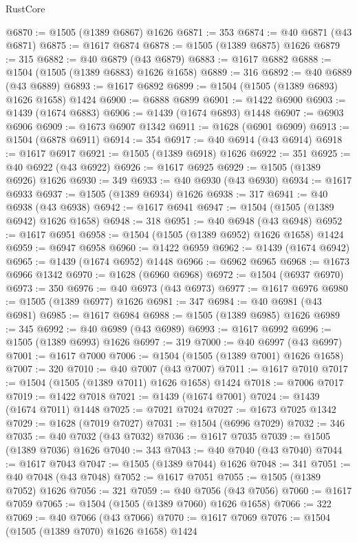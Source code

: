 \begin{lexlean}{RustCore}
\begin{coremodule}
@6870 := @1505 (@1389 @6867) @1626
@6871 := 353
@6874 := @40 @6871 (@43 @6871)
@6875 := @1617 @6874
@6878 := @1505 (@1389 @6875) @1626
@6879 := 315
@6882 := @40 @6879 (@43 @6879)
@6883 := @1617 @6882
@6888 := @1504 (@1505 (@1389 @6883) @1626 @1658)
@6889 := 316
@6892 := @40 @6889 (@43 @6889)
@6893 := @1617 @6892
@6899 := @1504 (@1505 (@1389 @6893) @1626 @1658) @1424
@6900 := @6888 @6899
@6901 := @1422 @6900
@6903 := @1439 (@1674 @6883)
@6906 := @1439 (@1674 @6893) @1448
@6907 := @6903 @6906
@6909 := @1673 @6907 @1342
@6911 := @1628 (@6901 @6909)
@6913 := @1504 (@6878 @6911)
@6914 := 354
@6917 := @40 @6914 (@43 @6914)
@6918 := @1617 @6917
@6921 := @1505 (@1389 @6918) @1626
@6922 := 351
@6925 := @40 @6922 (@43 @6922)
@6926 := @1617 @6925
@6929 := @1505 (@1389 @6926) @1626
@6930 := 349
@6933 := @40 @6930 (@43 @6930)
@6934 := @1617 @6933
@6937 := @1505 (@1389 @6934) @1626
@6938 := 317
@6941 := @40 @6938 (@43 @6938)
@6942 := @1617 @6941
@6947 := @1504 (@1505 (@1389 @6942) @1626 @1658)
@6948 := 318
@6951 := @40 @6948 (@43 @6948)
@6952 := @1617 @6951
@6958 := @1504 (@1505 (@1389 @6952) @1626 @1658) @1424
@6959 := @6947 @6958
@6960 := @1422 @6959
@6962 := @1439 (@1674 @6942)
@6965 := @1439 (@1674 @6952) @1448
@6966 := @6962 @6965
@6968 := @1673 @6966 @1342
@6970 := @1628 (@6960 @6968)
@6972 := @1504 (@6937 @6970)
@6973 := 350
@6976 := @40 @6973 (@43 @6973)
@6977 := @1617 @6976
@6980 := @1505 (@1389 @6977) @1626
@6981 := 347
@6984 := @40 @6981 (@43 @6981)
@6985 := @1617 @6984
@6988 := @1505 (@1389 @6985) @1626
@6989 := 345
@6992 := @40 @6989 (@43 @6989)
@6993 := @1617 @6992
@6996 := @1505 (@1389 @6993) @1626
@6997 := 319
@7000 := @40 @6997 (@43 @6997)
@7001 := @1617 @7000
@7006 := @1504 (@1505 (@1389 @7001) @1626 @1658)
@7007 := 320
@7010 := @40 @7007 (@43 @7007)
@7011 := @1617 @7010
@7017 := @1504 (@1505 (@1389 @7011) @1626 @1658) @1424
@7018 := @7006 @7017
@7019 := @1422 @7018
@7021 := @1439 (@1674 @7001)
@7024 := @1439 (@1674 @7011) @1448
@7025 := @7021 @7024
@7027 := @1673 @7025 @1342
@7029 := @1628 (@7019 @7027)
@7031 := @1504 (@6996 @7029)
@7032 := 346
@7035 := @40 @7032 (@43 @7032)
@7036 := @1617 @7035
@7039 := @1505 (@1389 @7036) @1626
@7040 := 343
@7043 := @40 @7040 (@43 @7040)
@7044 := @1617 @7043
@7047 := @1505 (@1389 @7044) @1626
@7048 := 341
@7051 := @40 @7048 (@43 @7048)
@7052 := @1617 @7051
@7055 := @1505 (@1389 @7052) @1626
@7056 := 321
@7059 := @40 @7056 (@43 @7056)
@7060 := @1617 @7059
@7065 := @1504 (@1505 (@1389 @7060) @1626 @1658)
@7066 := 322
@7069 := @40 @7066 (@43 @7066)
@7070 := @1617 @7069
@7076 := @1504 (@1505 (@1389 @7070) @1626 @1658) @1424

\end{coremodule}
\end{lexlean}
